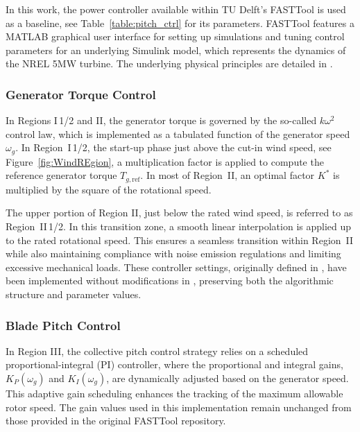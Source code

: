 In this work, the power controller available within TU Delft's FASTTool \cite{mulders2020wind} is used as a baseline, see Table~\ref{table:pitch_ctrl} for its parameters. FASTTool features a MATLAB graphical user interface for setting up simulations and tuning control parameters for an underlying Simulink model, which represents the dynamics of the NREL 5MW turbine. The underlying physical principles are detailed in \cite{jonkman2009definition}. 


\subsubsection{Generator Torque Control}

In Regions I\,1/2 and II, the generator torque is governed by the so-called $k\omega^2$ control law, which is implemented as a tabulated function of the generator speed $\omega_g$. In Region~I\,1/2, the start-up phase just above the cut-in wind speed, see Figure~\ref{fig:WindREgion}, a multiplication factor is applied to compute the reference generator torque $T_{g,\text{ref}}$. In most of Region~II, an optimal factor $K^*$ is multiplied by the square of the rotational speed.

The upper portion of Region II, just below the rated wind speed, is referred to as Region~II\,1/2. In this transition zone, a smooth linear interpolation is applied up to the rated rotational speed. This ensures a seamless transition within Region~II while also maintaining compliance with noise emission regulations and limiting excessive mechanical loads. These controller settings, originally defined in \cite{jonkman2009definition}, have been implemented without modifications in \cite{mulders2020wind}, preserving both the algorithmic structure and parameter values.

\subsubsection{Blade Pitch Control} 

In Region III, the collective pitch control strategy relies on a scheduled proportional-integral (PI) controller, where the proportional and integral gains, $K_P(\omega_g)$ and $K_I(\omega_g)$, are dynamically adjusted based on the generator speed. This adaptive gain scheduling enhances the tracking of the maximum allowable rotor speed. The gain values used in this implementation remain unchanged from those provided in the original FASTTool repository.

